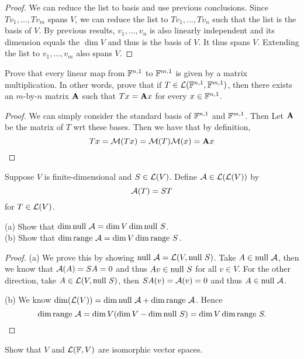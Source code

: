 \documentclass{extarticle}
\begin{document}
\begin{proof}
We can reduce the list to basis and use previous conclusions. Since \(T v_1, \ldots, T v_m\) spans \(V\), 
we can reduce the list to \(T v_1, \ldots, T v_n\) such that the list is the basis of \(V\). By previous 
results, \(v_1, \ldots, v_n\) is also linearly independent and its dimension equals the \(\dim V\) and thus 
is the basis of \(V\). It thus spans \(V\). Extending the list to \(v_1, \ldots, v_m\) also spans \(V\). 
\end{proof}

\begin{problem}{16}
    Prove that every linear map from \(\mathbb{F}^{n, 1}\) to \(\mathbb{F}^{m, 1}\) is given by a matrix multiplication. 
    In other words, prove that if \(T \in \mathcal{L}(\mathbb{F}^{n, 1}, \mathbb{F}^{m, 1})\), then there exists an \(m\)-by-\(n\) matrix 
    \(\mathbf{A}\) such that \(Tx =\mathbf{A} x\) for every \(x \in \mathbb{F}^{n, 1}\).
\end{problem}

\begin{proof}
We can simply consider the standard basis of \(\mathbb{F}^{n, 1}\) and \(\mathbb{F}^{m, 1}\). Then Let \(\mathbf{A}\) be the matrix 
of \(T\) wrt these bases. Then we have that by definition, 
\[T x = \mathcal{M}(Tx) = \mathcal{M}(T) \mathcal{M}(x) = \mathbf{A} x\]
\end{proof}

\begin{problem}{17}
    Suppose \(V\) is finite-dimensional and \(S \in \mathcal{L}(V)\). Define \(\mathcal{A} \in \mathcal{L}(\mathcal{L}(V))\) by 
    \[\mathcal{A}(T) = ST\] 
    for \(T \in \mathcal{L}(V)\). 

    (a) Show that \(\dim \text{null } \mathcal{A} = \dim V \dim \text{null } S\). \\ 
    (b) Show that \(\dim \text{range } \mathcal{A} = \dim V \dim \text{range } S\). 
\end{problem}

\begin{proof}
(a) We prove this by showing \(\text{null } \mathcal{A} = \mathcal{L}(V,\text{null } S)\). Take \(A \in \text{null } \mathcal{A}\), then we know that 
\(\mathcal{A} (A) = SA = 0\) and thus \(Av \in \text{null } S\) for all \(v \in V\). For the other direction, take 
\(A \in \mathcal{L}(V, \text{null } S)\), then \(SA(v) = \mathcal{A}(v) = 0\) and thus \(A \in \text{null } \mathcal{A}\). 

(b) We know \(\dim (\mathcal{L}(V)) = \dim \text{null } \mathcal{A} + \dim \text{range } \mathcal{A}\). Hence 
\[\dim \text{range } \mathcal{A} = \dim V (\dim V - \dim \text{null } S) = \dim V \dim \text{range } S.\]
\end{proof}

\begin{problem}{18}
    Show that \(V\) and \(\mathcal{L}(\mathbb{F}, V)\) are isomorphic vector spaces. 
\end{problem}
\end{document}
